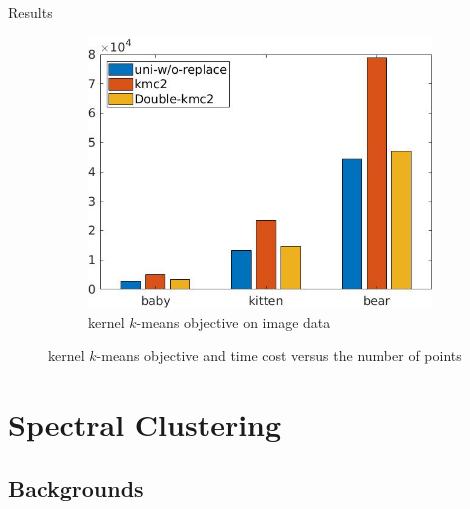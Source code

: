 \documentclass{beamer}
\begin{document}
\begin{frame}{Results}
{\begin{minipage}{1.0\linewidth}
\begin{figure}[H]
\begin{subfigure}{0.493\columnwidth}
					\centering 
					\includegraphics[width=\linewidth]{image-obj.jpg}
					\caption{kernel $k$-means objective on image data}
				\end{subfigure}
				
				
				\caption{kernel $k$-means objective and time cost versus the number of points}
				\label{fig: image running time & ncut}
			\end{figure}
		\end{minipage}
	}
	
\end{frame}

\section{Spectral Clustering}

\subsection{Backgrounds}
\end{document}
